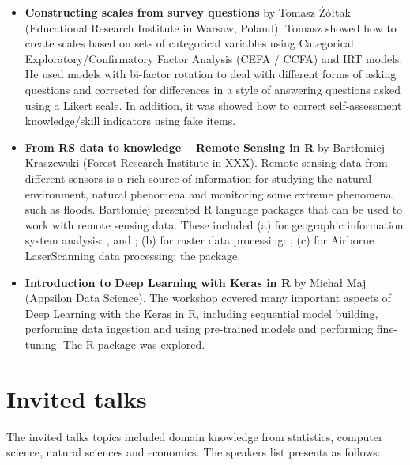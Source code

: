\begin{itemize}
    \item \textbf{Constructing scales from survey questions} by Tomasz \.{Z}\'{o}\l{}tak (Educational Research Institute in Warsaw, Poland). Tomasz showed how to create scales based on sets of categorical variables using Categorical Exploratory/Confirmatory Factor Analysis (CEFA / CCFA) and IRT models. He used models with bi-factor rotation to deal with different forms of asking questions and corrected for differences in a style of answering questions asked using a Likert scale. In addition, it was showed how to correct self-assessment knowledge/skill indicators using fake items.
    \item \textbf{From RS data to knowledge – Remote Sensing in R} by Bart\l{}omiej Kraszewski (Forest Research Institute in XXX). Remote sensing data from different sensors is a rich source of information for studying the natural environment, natural phenomena and monitoring some extreme phenomena, such as floods. Bart\l{}omiej presented R language packages that can be used to work with remote sensing data. These included (a) for geographic information system analysis:  \citep{bivand_rgdal:_2018},  \citep{bivand_rgeos:_2018} and  \citep{pebesma_sf:_2018}; (b) for raster data processing:  \citep{hijmans_raster:_2017}; (c)  for Airborne LaserScanning data processing:  the  \citep{roussel_lidr:_2018} package. 
    \item \textbf{Introduction to Deep Learning with Keras in R} by Micha\l{} Maj (Appsilon Data Science). The workshop covered many important aspects of Deep Learning with the Keras in R, including sequential model building, performing data ingestion and using pre-trained models and performing fine-tuning. The   \citep{allaire_keras:_2018} R package was explored. 
\end{itemize}


\section{Invited talks}

The invited talks topics included domain knowledge from statistics, computer science, natural sciences and economics. The speakers list presents as follows: 

